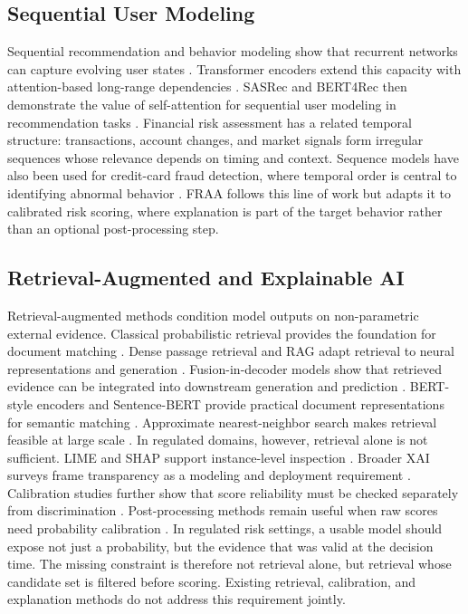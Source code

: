 \documentclass[runningheads]{llncs}
\begin{document}
\subsection{Sequential User Modeling}
Sequential recommendation and behavior modeling show that recurrent networks can capture evolving user states \cite{hochreiter1997lstm,cho2014learning}. Transformer encoders extend this capacity with attention-based long-range dependencies \cite{vaswani2017attention}. SASRec and BERT4Rec then demonstrate the value of self-attention for sequential user modeling in recommendation tasks \cite{kang2018sasrec,sun2019bert4rec}. Financial risk assessment has a related temporal structure: transactions, account changes, and market signals form irregular sequences whose relevance depends on timing and context. Sequence models have also been used for credit-card fraud detection, where temporal order is central to identifying abnormal behavior \cite{jurgovsky2018sequence}. FRAA follows this line of work but adapts it to calibrated risk scoring, where explanation is part of the target behavior rather than an optional post-processing step.

\subsection{Retrieval-Augmented and Explainable AI}
Retrieval-augmented methods condition model outputs on non-parametric external evidence. Classical probabilistic retrieval provides the foundation for document matching \cite{robertson2009probabilistic}. Dense passage retrieval and RAG adapt retrieval to neural representations and generation \cite{karpukhin2020dpr,lewis2020rag}. Fusion-in-decoder models show that retrieved evidence can be integrated into downstream generation and prediction \cite{izacard2021leveraging}. BERT-style encoders and Sentence-BERT provide practical document representations for semantic matching \cite{devlin2019bert,reimers2019sentence}. Approximate nearest-neighbor search makes retrieval feasible at large scale \cite{malkov2020hnsw,johnson2019billion}. In regulated domains, however, retrieval alone is not sufficient. LIME and SHAP support instance-level inspection \cite{ribeiro2016lime,lundberg2017shap}. Broader XAI surveys frame transparency as a modeling and deployment requirement \cite{guidotti2018survey,arrieta2020explainable}. Calibration studies further show that score reliability must be checked separately from discrimination \cite{guo2017calibration,niculescu2005predicting}. Post-processing methods remain useful when raw scores need probability calibration \cite{zadrozny2002transforming}. In regulated risk settings, a usable model should expose not just a probability, but the evidence that was valid at the decision time. The missing constraint is therefore not retrieval alone, but retrieval whose candidate set is filtered before scoring. Existing retrieval, calibration, and explanation methods do not address this requirement jointly.
\end{document}
